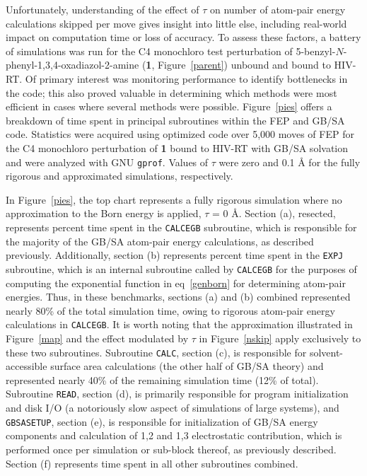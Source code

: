 \documentclass[12pt]{report}
\def\figlab{Figure}\def\figslab{\figlab s}
\def\equlab{eq}\def\equslab{Eqs.}
\newcommand*\eq[1]{\equlab~\ref{#1}}
\newcommand*\fig[1]{\figlab~\ref{#1}}
\begin{document}
Unfortunately, understanding of the effect of $\tau$ on number of atom-pair energy calculations skipped per move gives insight into little else, including real-world impact on computation time or loss of accuracy. To assess these factors, a battery of simulations was run for the C4 monochloro test perturbation of 5-benzyl-$N$-phenyl-1,3,4-oxadiazol-2-amine (\textbf{1}, \fig{parent}) unbound and bound to HIV-RT. Of primary interest was monitoring performance to identify bottlenecks in the code; this also proved valuable in determining which methods were most efficient in cases where several methods were possible. \fig{pies} offers a breakdown of time spent in principal subroutines within the FEP and GB/SA code. Statistics were acquired using optimized code over 5,000 moves of FEP for the C4 monochloro perturbation of \textbf{1} bound to HIV-RT with GB/SA solvation and were analyzed with GNU \texttt{gprof}. Values of $\tau$ were zero and 0.1 \AA{} for the fully rigorous and approximated simulations, respectively.

In \fig{pies}, the top chart represents a fully rigorous simulation where no approximation to the Born energy is applied, $\tau$ = 0 \AA. Section (a), resected, represents percent time spent in the {\tt CALCEGB} subroutine, which is responsible for the majority of the GB/SA atom-pair energy calculations, as described previously. Additionally, section (b) represents percent time spent in the {\tt EXPJ} subroutine, which is an internal subroutine called by {\tt CALCEGB} for the purposes of computing the exponential function in \eq{genborn} for determining atom-pair energies. Thus, in these benchmarks, sections (a) and (b) combined represented nearly 80\% of the total simulation time, owing to rigorous atom-pair energy calculations in {\tt CALCEGB}. It is worth noting that the approximation illustrated in \fig{map} and the effect modulated by $\tau$ in \fig{nskip} apply exclusively to these two subroutines. Subroutine {\tt CALC}, section (c), is responsible for solvent-accessible surface area calculations (the other half of GB/SA theory) and represented nearly 40\% of the remaining simulation time (12\% of total). Subroutine {\tt READ}, section (d), is primarily responsible for program initialization and disk I/O (a notoriously slow aspect of simulations of large systems), and {\tt GBSASETUP}, section (e), is responsible for initialization of GB/SA energy components and calculation of 1,2 and 1,3 electrostatic contribution, which is performed once per simulation or sub-block thereof, as previously described. Section (f) represents time spent in all other subroutines combined.
\end{document}
